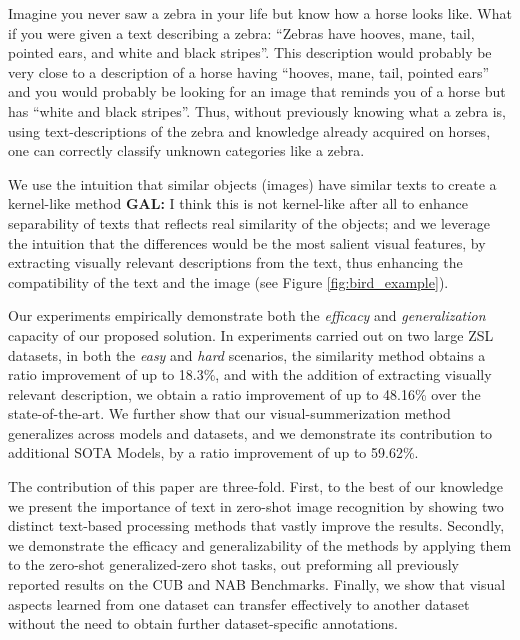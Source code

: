 \documentclass[11pt,a4paper]{article}
\newcommand\gal[1]{\textcolor{bright}{\textbf{GAL:} #1 }}
\newcommand\tzuf[1]{\textcolor{blue}{\textbf{TZUF:} #1 }}
\begin{document}
Imagine you never saw a zebra in your life but know how a horse looks like. What if you were given a text describing a zebra: \enquote{Zebras have hooves, mane, tail, pointed ears, and white and black stripes}. This description would probably be very close to a description of a horse having \enquote{hooves, mane, tail, pointed ears} and you would probably be looking for an image that reminds you of a horse but has \enquote{white and black stripes}. Thus, without previously knowing what a zebra is, using text-descriptions of the zebra and  knowledge already acquired on horses, one can correctly classify unknown categories like a zebra.

We use the intuition that similar objects (images) have similar texts to create a kernel-like method \gal{I think this is not kernel-like after all} to enhance separability of texts that reflects real similarity of the objects; and we leverage the intuition that the differences would be the most salient visual features, by extracting visually relevant  descriptions from the text, thus enhancing the compatibility of the text and the image (see Figure \ref{fig:bird_example}). 



Our experiments empirically demonstrate both the {\em efficacy} and  {\em generalization} capacity of our proposed solution. 
In experiments carried out on two large ZSL datasets, %
in both the {\em easy} and {\em hard} scenarios, the similarity method obtains a ratio improvement of up to 18.3\%, and with the addition of extracting visually relevant description, we obtain a ratio improvement of up to 48.16\% over the state-of-the-art.
We further show that our visual-summerization method generalizes across models and datasets, and we demonstrate its contribution to additional SOTA Models, by a ratio improvement of up to 59.62\%.



The contribution of this paper are three-fold.
First,  to the best of our knowledge we present the importance of text in zero-shot image recognition by showing two distinct text-based processing methods that vastly improve the results.
Secondly, we demonstrate the efficacy and generalizability of the methods by applying them to the zero-shot generalized-zero shot tasks, out preforming all previously reported results on the CUB and NAB Benchmarks. Finally, we show that visual aspects learned from one dataset can transfer effectively  to another dataset without the need to obtain further dataset-specific annotations.  
\end{document}
